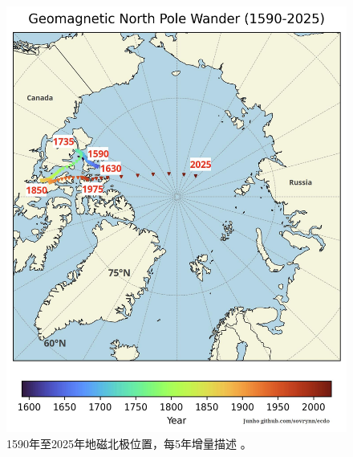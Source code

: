 \documentclass[10pt,twocolumn,letterpaper]{article}
\begin{document}
\begin{figure}[t]
\begin{center}
   \includegraphics[width=1\linewidth]{npw.jpg}
\end{center}
   \caption{1590年至2025年地磁北极位置，每5年增量描述 \cite{142}。}
\label{fig:13}
\label{fig:onecol}
\end{figure}
\end{document}
